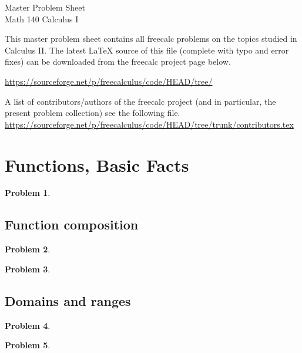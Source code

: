 \documentclass{article}
\newtheorem{problem}{Problem}
\begin{document}
\begin{center}
\Large
Master Problem Sheet \\ Math 140 Calculus I \\ 
\end{center}





This master problem sheet contains all freecalc problems on the topics studied in Calculus II. The latest \LaTeX{} source of this file (complete with typo and error fixes) can be downloaded from the freecalc project page below. 

\url{https://sourceforge.net/p/freecalculus/code/HEAD/tree/}

A list of contributors/authors of the freecalc project (and in particular, the present problem collection) see the following file.
\url{https://sourceforge.net/p/freecalculus/code/HEAD/tree/trunk/contributors.tex}

\section{Functions, Basic Facts}
\begin{problem}

\end{problem}
\subsection{Function composition}
\begin{problem}

\end{problem}
\begin{problem}

\end{problem}
\subsection{Domains and ranges}
\begin{problem}

\end{problem}
\begin{problem}

\end{problem}
\end{document}
